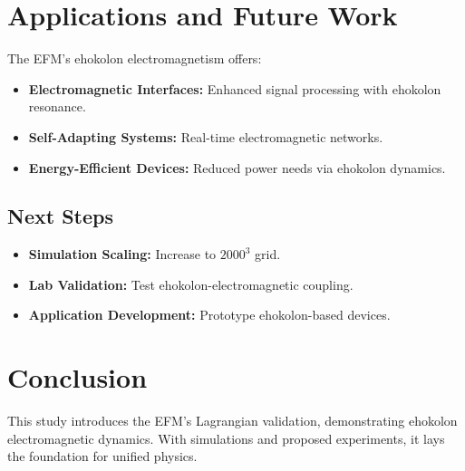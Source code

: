 \documentclass{article}
\begin{document}
\section{Applications and Future Work}
The EFM’s ehokolon electromagnetism offers:
\begin{itemize}
    \item \textbf{Electromagnetic Interfaces:} Enhanced signal processing with ehokolon resonance.
    \item \textbf{Self-Adapting Systems:} Real-time electromagnetic networks.
    \item \textbf{Energy-Efficient Devices:} Reduced power needs via ehokolon dynamics.
\end{itemize}

\subsection{Next Steps}
\begin{itemize}
    \item \textbf{Simulation Scaling:} Increase to \(2000^3\) grid.
    \item \textbf{Lab Validation:} Test ehokolon-electromagnetic coupling.
    \item \textbf{Application Development:} Prototype ehokolon-based devices.
\end{itemize}

\section{Conclusion}
This study introduces the EFM’s Lagrangian validation, demonstrating ehokolon electromagnetic dynamics. With simulations and proposed experiments, it lays the foundation for unified physics.
\end{document}
